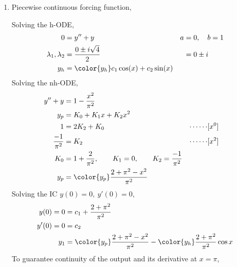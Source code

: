 \begin{enumerate}
    \item Piecewise continuous forcing function, \par
          Solving the h-ODE,
          \begin{align}
              0                        & = y'' + y                                 &
              a                        & = 0, \quad b = 1                            \\
              \lambda_{1}, \lambda_{2} & = \frac{0 \pm i\sqrt{4}}{2}               &
                                       & = 0 \pm i                                   \\
              y_{h}                    & = \color{y_h} c_{1}\cos(x) + c_{2}\sin(x)
          \end{align}
          Solving the nh-ODE,
          \begin{align}
              y'' + y             & = 1 - \frac{x^{2}}{\pi^{2}}                  \\
              y_{p}               & = K_{0} + K_{1}x + K_{2}x^{2}                \\
              1                   & = 2K_{2} + K_{0}                           &
              \cdots\cdots        & [x^{0}]                                      \\
              \frac{-1}{\pi ^{2}} & = K_{2}                                    &
              \cdots\cdots        & [x^{2}]                                      \\
              K_{0}               & = 1 + \frac{2}{\pi^{2}}, \qquad K_{1} = 0,
              \qquad K_{2} = \frac{-1}{\pi^{2}}                                  \\
              y_{p}               & = \color{y_p} \frac{2 + \pi^{2}
                  - x^{2}}{\pi^{2}}
          \end{align}
          Solving the IC $ y(0) = 0,\ y'(0) = 0 $,
          \begin{align}
              y(0) = 0  & = c_{1} + \frac{2 + \pi^{2}}{\pi^{2}}                \\
              y'(0) = 0 & = c_{2}                                              \\
              y_{1}     & = {\color{y_p} \frac{2 + \pi^{2} - x^{2}}{\pi^{2} }}
              - {\color{y_h} \frac{2 + \pi^{2}}{\pi^{2}}\cos x}
          \end{align}
          To guarantee continuity of the output and its derivative at $ x = \pi $,
          \begin{align}

\end{align}
\end{enumerate}
